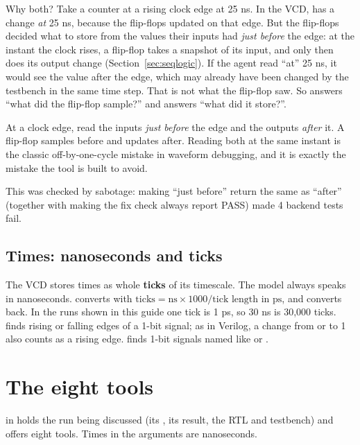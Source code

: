 Why both? Take a counter at a rising clock edge at 25 ns. In the VCD,  has a change \emph{at} 25 ns, because the flip-flops updated on that edge. But the flip-flops decided what to store from the values their inputs had \emph{just before} the edge: at the instant the clock rises, a flip-flop takes a snapshot of its input, and only then does its output change (Section~\ref{sec:seqlogic}). If the agent read  ``at'' 25 ns, it would see the value after the edge, which may already have been changed by the testbench in the same time step. That is not what the flip-flop saw. So  answers ``what did the flip-flop sample?'' and  answers ``what did it store?''.

\begin{keyidea}
At a clock edge, read the inputs \emph{just before} the edge and the outputs \emph{after} it. A flip-flop samples before and updates after. Reading both at the same instant is the classic off-by-one-cycle mistake in waveform debugging, and it is exactly the mistake the  tool is built to avoid.
\end{keyidea}

This was checked by sabotage: making ``just before'' return the same as ``after'' (together with making the fix check always report PASS) made 4 backend tests fail.

\subsection{Times: nanoseconds and ticks}

The VCD stores times as whole \textbf{ticks} of its timescale. The model always speaks in nanoseconds.  converts with $\text{ticks} = \text{ns} \times 1000 / \text{tick length in ps}$, and  converts back. In the runs shown in this guide one tick is 1 ps, so 30 ns is 30,000 ticks.  finds rising or falling edges of a 1-bit signal; as in Verilog, a change from  or  to 1 also counts as a rising edge.  finds 1-bit signals named like  or .

\section{The eight tools}

 in  holds the run being discussed (its , its result, the RTL and testbench) and offers eight tools. Times in the arguments are nanoseconds.

